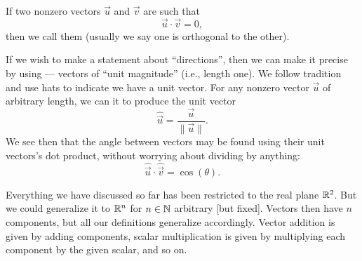 \begin{definition}
If two nonzero vectors $\vec{u}$ and $\vec{v}$ are such that
\begin{equation}
\vec{u}\cdot\vec{v}=0,
\end{equation}
then we call them  (usually we say one is orthogonal
to the other).
\end{definition}

If we wish to make a statement about ``directions'', then we can make it
precise by using  --- vectors of ``unit magnitude''
(i.e., length one). We follow tradition and use hats to indicate we have
a unit vector. For any nonzero vector $\vec{u}$ of arbitrary length, we
can  it to produce the unit vector
\begin{equation}
\widehat{\vec{u}} = \frac{\vec{u}}{\|\vec{u}\|}.
\end{equation}
We see then that the angle between vectors may be found using their unit
vectors's dot product, without worrying about dividing by anything:
\begin{equation}
\widehat{\vec{u}}\cdot\widehat{\vec{v}}=\cos(\theta).
\end{equation}

Everything we have discussed so far has been restricted to the real
plane $\mathbb{R}^{2}$. But we could generalize it to $\mathbb{R}^{n}$ for $n\in\mathbb{N}$
arbitrary [but fixed]. Vectors then have $n$ components, but all our
definitions generalize accordingly. Vector addition is given by adding
components, scalar multiplication is given by multiplying each component
by the given scalar, and so on.